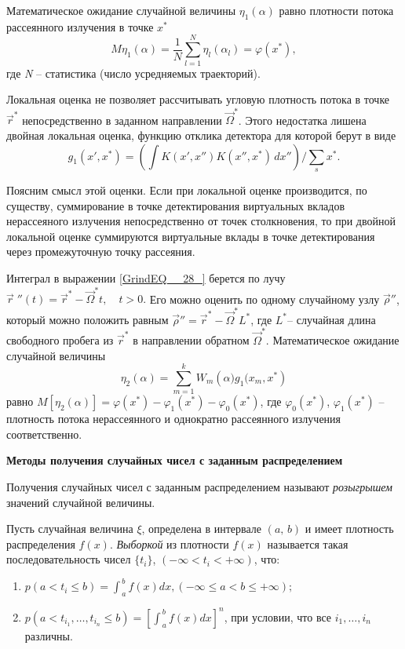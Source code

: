 \documentclass[
11pt,
master, %
subf, %
href, %
colorlinks=true, %
]{disser}
\begin{document}
Математическое ожидание случайной величины $\eta _{1} (\alpha )$ равно плотности потока рассеянного излучения в точке $x^{*} $
\begin{equation} \label{GrindEQ__27_}
M\eta _{1} (\alpha )=\frac{1}{N} \sum _{l=1}^{N}\eta _{l}  (\alpha _{l} )=\varphi (x^{*} ),
\end{equation}
где \textit{N }-- статистика (число усредняемых траекторий).

Локальная оценка не позволяет рассчитывать угловую плотность потока в точке $\vec{r}^{*} $ непосредственно в заданном направлении $\vec{\Omega }^{*} $. Этого недостатка лишена двойная локальная оценка, функцию отклика детектора для которой берут в виде
\begin{equation} \label{GrindEQ__28_}
g_{1} \left(x',x^{*} \right)= \left(\int K \left(x',x'' \right)K \left(x'',x^{*} \right) \, dx''\right)/\sum _{s} x^{*}.
\end{equation}

Поясним смысл этой оценки. Если при локальной оценке производится, по существу, суммирование в точке детектирования виртуальных вкладов нерассеяного излучения непосредственно от точек столкновения, то при двойной локальной оценке суммируются виртуальные вклады в точке детектирования через промежуточную точку рассеяния.

Интеграл в выражении \eqref{GrindEQ__28_} берется по лучу $\vec{r}\; ''(t)=\vec{r}^{*} -\vec{\Omega }^{*} t,\quad t>0.$ Его можно оценить по одному случайному узлу $\vec{\rho }''$, который можно положить равным $\vec{\rho }''=\vec{r}^{*} -\vec{\Omega }^{*} L^{*} $, где $L^{*} $-- случайная длина свободного пробега из $\vec{r}^{*} $ в направлении обратном $\vec{\Omega }^{*} $. Математическое ожидание случайной величины
\begin{equation} \label{GrindEQ__30_}
\eta _{2} (\alpha )=\sum _{m=1}^{k}W_{m} \left(\alpha )g_{1} (x_{m} ,x^{*} \right)
\end{equation}
равно $M[\eta _{2} (\alpha )]=\varphi (x^{*} )-\varphi _{1} (x^{*} )-\varphi _{0} (x^{*} )$,
где $\varphi _{0} (x^{*} )$, $\varphi _{1} (x^{*} )$ -- плотность потока нерассеянного и однократно рассеянного излучения соответственно.

\textbf{Методы получения случайных чисел с заданным распределением}

Получения случайных чисел с заданным распределением называют \textit{розыгрышем} значений случайной величины.

Пусть случайная величина $\xi $, определена в интервале $(a,\, b)$ и имеет плотность распределения $f(x)$. \textit{Выборкой} из плотности $f(x)$ называется такая последовательность чисел $\{t_i\}$,  $(-\infty <t_{i} <+\infty )$, что:
\begin{enumerate}
  \item $p(a<t_{i} \le b)=\int _{\, a}^{\, b}f(x) dx,  (-\infty \le a<b\le +\infty );$
  \item $p \left(a<t_{i_{1} } ,\ldots ,t_{i_{n} } \le b \right)=\left[\int _{\, a}^{\, b}f(x) dx\right]^{n} $,  при условии, что все $i_{1} ,\ldots ,i_{n} $ различны.
\end{enumerate}
\end{document}
